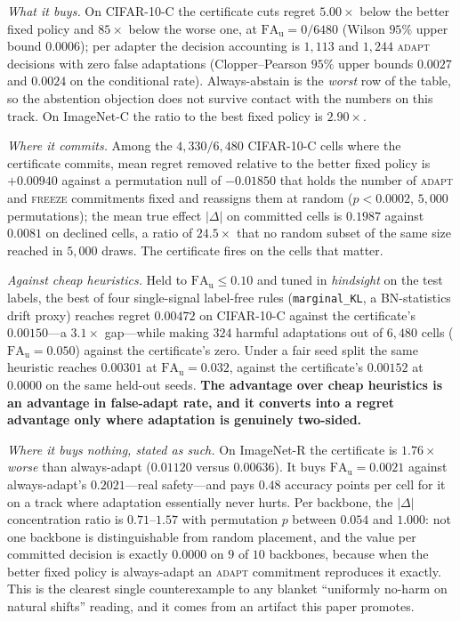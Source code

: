 \documentclass[conference]{IEEEtran}
\theoremstyle{plain}
\theoremstyle{definition}
\begin{document}
\emph{What it buys.} On CIFAR-10-C the certificate cuts regret $5.00\times$ below the better fixed
policy and $85\times$ below the worse one, at $\mathrm{FA}_{\mathrm u}=0/6480$ (Wilson $95\%$ upper
bound $0.0006$); per adapter the decision accounting is $1{,}113$ and $1{,}244$ \textsc{adapt}
decisions with zero false adaptations (Clopper--Pearson $95\%$ upper bounds $0.0027$ and $0.0024$
on the conditional rate). Always-abstain is the \emph{worst} row of the table, so the abstention
objection does not survive contact with the numbers on this track. On ImageNet-C the ratio to the
best fixed policy is $2.90\times$.

\emph{Where it commits.} Among the $4{,}330/6{,}480$ CIFAR-10-C cells where the certificate
commits, mean regret removed relative to the better fixed policy is $+0.00940$ against a
permutation null of $-0.01850$ that holds the number of \textsc{adapt} and \textsc{freeze}
commitments fixed and reassigns them at random ($p<0.0002$, $5{,}000$ permutations); the mean true
effect $|\Delta|$ on committed cells is $0.1987$ against $0.0081$ on declined cells, a ratio of
$24.5\times$ that no random subset of the same size reached in $5{,}000$ draws. The certificate
fires on the cells that matter.

\emph{Against cheap heuristics.} Held to $\mathrm{FA}_{\mathrm u}\le0.10$ and tuned in
\emph{hindsight} on the test labels, the best of four single-signal label-free rules
(\texttt{marginal\_KL}, a BN-statistics drift proxy) reaches regret $0.00472$ on CIFAR-10-C against
the certificate's $0.00150$---a $3.1\times$ gap---while making $324$ harmful adaptations out of
$6{,}480$ cells ($\mathrm{FA}_{\mathrm u}=0.050$) against the certificate's zero. Under a fair
seed split the same heuristic reaches $0.00301$ at $\mathrm{FA}_{\mathrm u}=0.032$, against the
certificate's $0.00152$ at $0.0000$ on the same held-out seeds. \textbf{The advantage over cheap
heuristics is an advantage in false-adapt rate, and it converts into a regret advantage only where
adaptation is genuinely two-sided.}

\emph{Where it buys nothing, stated as such.} On ImageNet-R the certificate is $1.76\times$
\emph{worse} than always-adapt ($0.01120$ versus $0.00636$). It buys
$\mathrm{FA}_{\mathrm u}=0.0021$ against always-adapt's $0.2021$---real safety---and pays $0.48$
accuracy points per cell for it on a track where adaptation essentially never hurts. Per backbone,
the $|\Delta|$ concentration ratio is $0.71$--$1.57$ with permutation $p$ between $0.054$ and
$1.000$: not one backbone is distinguishable from random placement, and the value per committed
decision is exactly $0.0000$ on $9$ of $10$ backbones, because when the better fixed policy is
always-adapt an \textsc{adapt} commitment reproduces it exactly. This is the clearest single
counterexample to any blanket ``uniformly no-harm on natural shifts'' reading, and it comes from an
artifact this paper promotes.
\end{document}
